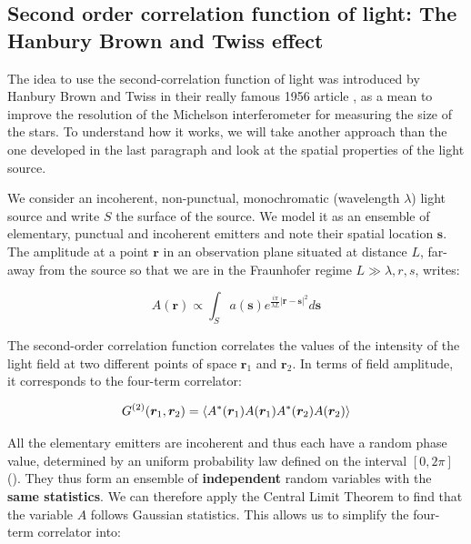


\subsection{Second order correlation function of light: The Hanbury Brown and Twiss effect}

The idea to use the second-correlation function of light was introduced by Hanbury Brown and Twiss in their really famous 1956 article \cite{brown1954lxxiv}, as a mean to improve the resolution of the Michelson interferometer for measuring the size of the stars. To understand how it works, we will take another approach than the one developed in the last paragraph and look at the spatial properties of the light source. 

We consider an incoherent, non-punctual, monochromatic (wavelength $\lambda$) light source and write $S$ the surface of the source. We model it as an ensemble of elementary, punctual and incoherent emitters and note their spatial location $\bm{s}$. The amplitude at a point $\bm{r}$ in an observation plane situated at distance $L$, far-away from the source so that we are in the Fraunhofer regime $L \gg \lambda, r,s$, writes:

\begin{equation}
    A(\bm{r}) \propto \int_{S} a(\bm{s}) e^{\frac{i \pi}{\lambda L}|\bm{r}-\bm{s}|^{2}} d \bm{s}
    \label{eq:amp_HBT}
\end{equation}

The second-order correlation function correlates the values of the intensity of the light field at two different points of space $\bm{r}_1$ and $\bm{r}_2$. In terms of field amplitude, it corresponds to the four-term correlator:

\begin{equation}
    G^{(2)} (\bm{r}_1,\bm{r}_2) = \left\langle A^*(\bm{r}_1) A(\bm{r}_1) A^*(\bm{r}_2) A(\bm{r}_2)\right\rangle
\end{equation}

All the elementary emitters are incoherent and thus each have a random phase value, determined by an uniform probability law defined on the interval $[0,2\pi]$ (). They thus form an ensemble of \textbf{independent} random variables with the \textbf{same statistics}. We can therefore apply the Central Limit Theorem to find that the variable $A$ follows Gaussian statistics. This allows us to simplify the four-term correlator into:

